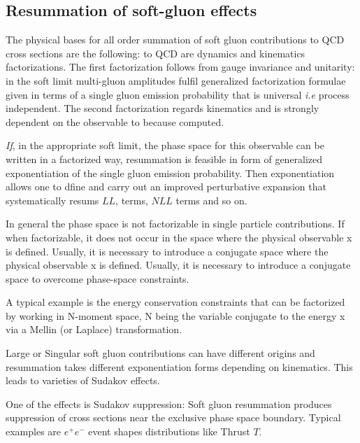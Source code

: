 \documentclass[../main.tex]{subfiles}
\begin{document}
\subsection{Resummation of soft-gluon effects}

The physical bases for all order summation of soft gluon contributions to QCD cross sections are the following:
to QCD are dynamics and kinematics factorizations. The first factorization follows from gauge invariance and 
unitarity: in the soft limit multi-gluon amplitudes fulfil generalized factorization formulae given in terms of a single gluon emission
probability that is universal \emph{i.e} process independent. The second factorization regards kinematics and is strongly dependent on the observable to because
computed. 

\emph{If}, in the appropriate soft limit, the phase space for this observable can be written in a factorized way, resummation is feasible in form of 
generalized exponentiation of the single gluon emission probability. Then exponentiation allows one to dfine and carry out an improved perturbative expansion
that systematically resums $LL$, terms, $NLL$ terms and so on.

In general the phase space is not factorizable in single particle contributions. If when factorizable, it does not occur in the space where the physical observable 
x is defined. Usually, it is necessary to introduce a conjugate space where the physical observable x is defined. Usually, it is necessary to 
introduce a conjugate space to overcome phase-space constraints. 

A typical example is the energy conservation constraints that can be factorized by working in N-moment space, N being the variable conjugate to the energy x 
via a Mellin (or Laplace) transformation.

Large or Singular soft gluon contributions can have different origins and resummation takes different exponentiation forms depending on kinematics.
This leads to varieties of Sudakov effects.

One of the effects is Sudakov suppression: Soft gluon resummation produces suppression of cross sections near the exclusive phase space boundary.
Typical examples are $e^+e^-$ event shapes distributions like Thrust $T$. 
\end{document}
